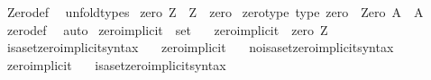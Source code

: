 \begin{isabellebody}
%
\isatagproof
{}\isamarkupfalse%
\ Zero{\isacharunderscore}{\kern0pt}def\ \isamarkupfalse%
\ unfold{\isacharunderscore}{\kern0pt}types%
\endisatagproof
{\isafoldproof}%
%
\isadelimproof
\isanewline
%
\endisadelimproof
\isanewline
{}\isamarkupfalse%
\ {\isachardoublequoteopen}zero\ Z\ {\isasymequiv}\ Z\ {\isacharat}{\kern0pt}{\isacharat}{\kern0pt}\ zero{\isachardoublequoteclose}\isanewline
\isanewline
{}\isamarkupfalse%
\ zero{\isacharunderscore}{\kern0pt}type\ {\isacharbrackleft}{\kern0pt}type{\isacharbrackright}{\kern0pt}{\isacharcolon}{\kern0pt}\ {\isachardoublequoteopen}zero\ {\isacharcolon}{\kern0pt}\ Zero\ A\ {\isasymRightarrow}\ A{\isachardoublequoteclose}\isanewline
%
\isadelimproof
\ \ %
\endisadelimproof
%
\isatagproof
{}\isamarkupfalse%
\ zero{\isacharunderscore}{\kern0pt}def\ \isamarkupfalse%
\ auto%
\endisatagproof
{\isafoldproof}%
%
\isadelimproof
\isanewline
%
\endisadelimproof
\isanewline
{}\isamarkupfalse%
\ zero{\isacharunderscore}{\kern0pt}implicit\ {\isacharcolon}{\kern0pt}{\isacharcolon}{\kern0pt}\ {\isachardoublequoteopen}set{\isachardoublequoteclose}\isanewline
\ \ \ {\isachardoublequoteopen}zero{\isacharunderscore}{\kern0pt}implicit\ {\isasymequiv}\ zero\ {\isasymimplicit}Z{\isachardoublequoteclose}\isanewline
\isanewline
{}\isamarkupfalse%
\ isa{\isacharunderscore}{\kern0pt}set{\isacharunderscore}{\kern0pt}zero{\isacharunderscore}{\kern0pt}implicit{\isacharunderscore}{\kern0pt}syntax\ \ \isamarkupfalse%
\ zero{\isacharunderscore}{\kern0pt}implicit\ {\isacharparenleft}{\kern0pt}{\isachardoublequoteopen}{}{\isachardoublequoteclose}{\isacharparenright}{\kern0pt}\ \isamarkupfalse%
\isanewline
{}\isamarkupfalse%
\ no{\isacharunderscore}{\kern0pt}isa{\isacharunderscore}{\kern0pt}set{\isacharunderscore}{\kern0pt}zero{\isacharunderscore}{\kern0pt}implicit{\isacharunderscore}{\kern0pt}syntax\ \ \isamarkupfalse%
\ zero{\isacharunderscore}{\kern0pt}implicit\ {\isacharparenleft}{\kern0pt}{\isachardoublequoteopen}{}{\isachardoublequoteclose}{\isacharparenright}{\kern0pt}\ \isamarkupfalse%
\isanewline
\isanewline
{}\isamarkupfalse%
\ isa{\isacharunderscore}{\kern0pt}set{\isacharunderscore}{\kern0pt}zero{\isacharunderscore}{\kern0pt}implicit{\isacharunderscore}{\kern0pt}syntax\isanewline

\end{isabellebody}
